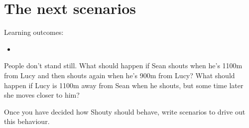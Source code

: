 \chapter*{The next scenarios}

\ifnotes

    Learning outcomes:
    
    \begin{itemize}
        \item  
    \end{itemize}

\fi 

\ifcontent 
    People don't stand still. What should happen if Sean shouts when he's 1100m from Lucy and then shouts again when he's 900m from Lucy? What should happen if Lucy is 1100m away from Sean when he shouts, but some time later she moves closer to him?
    
    Once you have decided how Shouty should behave, write scenarios to drive out this behaviour.
\fi